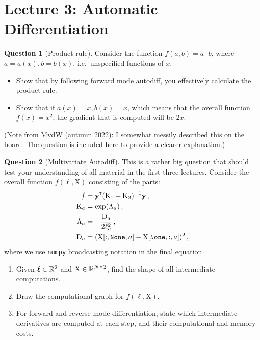 \documentclass[a4paper]{article}
\newcommand{\mat}[1]{{\mathrm{{#1}}}} %
\theoremstyle{definition}
\newtheorem{question}{Question}
\begin{document}
\section{Lecture 3: Automatic Differentiation}
\begin{question}[Product rule]
\label{q:autodiff-productrule} Consider the function $f(a, b) = a\cdot b$, where $a = a(x), b = b(x)$, i.e.~unspecified functions of $x$.
\begin{itemize}
\item Show that by following forward mode autodiff, you effectively calculate the product rule.
\item Show that if $a(x) = x, b(x) = x$, which means that the overall function $f(x) = x^2$, the gradient that is computed will be $2x$.
\end{itemize}
(Note from MvdW (autumn 2022): I somewhat messily described this on the board. The question is included here to provide a clearer explanation.)
\end{question}


\begin{question}[Multivariate Autodiff]
\label{q:autodiff} This is a rather big question that should test your understanding of all material in the first three lectures.
Consider the overall function $f(\boldsymbol \ell, \mat X)$ consisting of the parts:
\begin{align}
f &= \vy\transpose \left(\mat K_1 + \mat K_2\right)\inv \vy\,, \\
\mat K_a &= \exp\left(\mat \Lambda_a\right) \,, \\
\mat \Lambda_a &= -\frac{\mat D_a}{2\ell_a^2} \,, \\
\mat D_a &= (\mat X[:, \text{\texttt{None}}, a] - \mat X[\text{\texttt{None}}, :, a])^2 \,,
\end{align}
where we use \texttt{numpy} broadcasting notation in the final equation.
\begin{enumerate}[label=\alph*.]
\item Given $\boldsymbol \ell \in \mathbb{R}^2$ and $\mat X \in \Reals^{N\times 2}$, find the shape of all intermediate computations.
\item Draw the computational graph for $f(\boldsymbol\ell, \mat X)$.
\item For forward and reverse mode differentiation, state which intermediate derivatives are computed at each step, and their computational and memory costs.
\end{enumerate}
\end{question}
\end{document}
